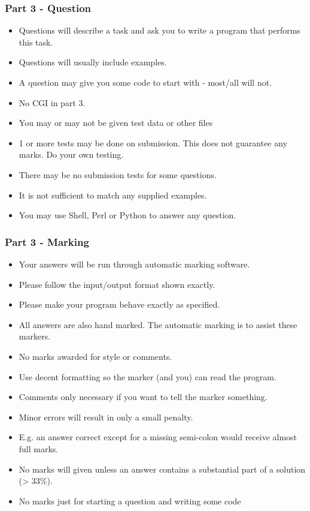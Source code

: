 \begin{frame}
\frametitle{Part 3 - Question}

\begin{itemize}
\item  Questions will describe a task and ask you to write a program that performs this task.
\item  Questions will usually include examples.
\item  A question may give you some code to start with - most/all will not.
\item  No CGI in part 3.
\item  You may or may not be given test data or other files
\item  1 or more tests may be done on submission.  This does not guarantee any marks.  Do your own testing.
\item  There may be no submission tests for some questions.
\item  It is not sufficient to match any supplied examples.
\item  You may use Shell, Perl or Python to answer any question. 
\end{itemize}
\end{frame}


\begin{frame}
\frametitle{Part 3 - Marking}
\begin{itemize}
\item  Your answers will be run through automatic marking software.
\item  Please follow the input/output format shown exactly.
\item  Please make your program behave exactly as specified.
\item  All answers are also hand marked.  The automatic marking is to assist these markers.
\item  No marks awarded for style or comments.
\item  Use decent formatting so the marker (and you) can read the program.
\item  Comments only necessary if you want to tell the marker something.
\item  Minor errors will result in only a small penalty.
\item  E.g. an answer correct except for a missing semi-colon would receive almost full marks.
\item  No marks will given unless an answer contains a substantial part of a solution (> 33\%).
\item  No marks just for starting a question and writing some code
\end{itemize}
\end{frame}

